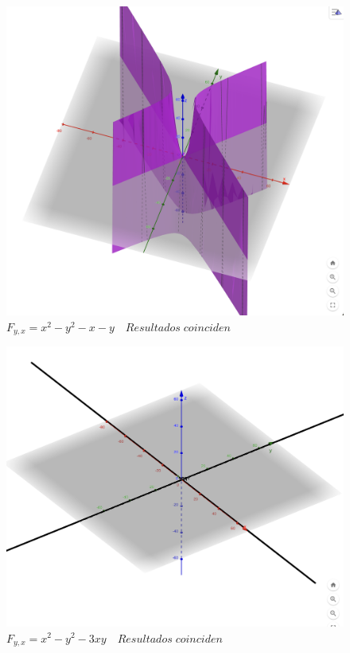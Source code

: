 \documentclass[13pt]{memoir}
\begin{document}
\begin{enumerate}
\begin{figure}[h]
    \centering
    \includegraphics[scale=0.3]{assets/t_2_4.png} 
    \caption{$F_{y,x}= x^2-y^2-x-y \quad Resultados \; coinciden$}
\end{figure}

\begin{figure}[h]
    \centering 
    \includegraphics[scale=0.3]{assets/t_2_5.png} 
    \caption{$F_{y,x}= x^2-y^2-3xy \quad  Resultados \; coinciden$}
\end{figure}\\ 


\end{enumerate}
\end{document}
